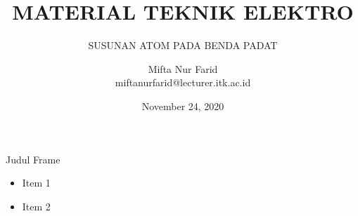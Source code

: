 \documentclass[aspectratio=169]{beamer}
\author{Mifta Nur Farid \\
	miftanurfarid@lecturer.itk.ac.id}
\title{MATERIAL TEKNIK ELEKTRO}
\subtitle{SUSUNAN ATOM PADA BENDA PADAT}
\institute{Teknik Elektro \\ Institut Teknologi Kalimantan \\ Balikpapan, Indonesia}
\date{\tiny November 24, 2020}
\begin{document}
\begin{frame}[t,plain]
\titlepage
\end{frame}

\begin{frame}{Judul Frame}
	\begin{itemize}
		\item Item 1
		\item Item 2
	\end{itemize}
\end{frame}
\end{document}
